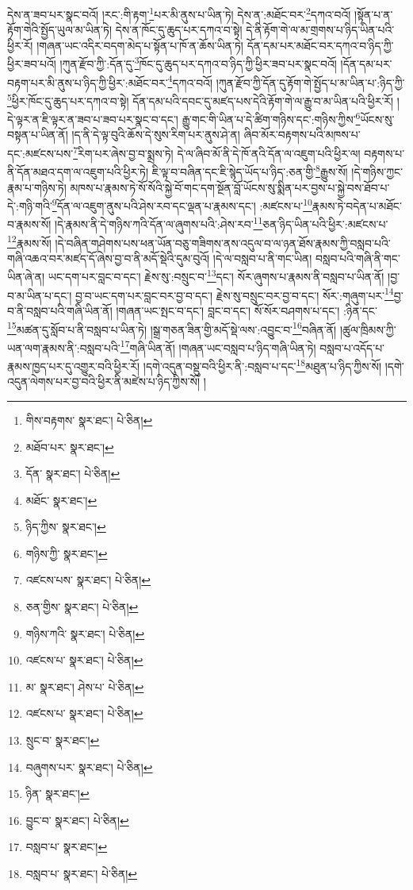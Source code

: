 དེས་ན་ཟབ་པར་སྣང་བའོ། །རང་:གི་རྟག་\footnote{གིས་བརྟགས་  སྣར་ཐང་།  པེ་ཅིན། }པར་མི་ནུས་པ་ཡིན་ཏེ། དེས་ན་:མཐོང་བར་\footnote{མཐོབ་པར་  སྣར་ཐང་། }དཀའ་བའོ། །སྟོན་པ་ན་རྟོག་གེའི་སྤྱོད་ཡུལ་མ་ཡིན་ཏེ། དེས་ན་ཁོང་དུ་ཆུད་པར་དཀའ་བ་སྟེ། དེ་ནི་རྟོག་གེ་ལ་མ་གྲགས་པ་ཉིད་ཡིན་པའི་ཕྱིར་རོ། །གཞན་ཡང་འདིར་བདག་མེད་པ་སྟོན་པ་ཁོ་ན་ཆོས་ཡིན་ཏེ། དོན་དམ་པར་མཐོང་བར་དཀའ་བ་ཉིད་ཀྱི་ཕྱིར་ཟབ་པའོ། །ཀུན་རྫོབ་ཀྱི་:དོན་དུ་\footnote{དོན་  སྣར་ཐང་།  པེ་ཅིན། }ཁོང་དུ་ཆུད་པར་དཀའ་བ་ཉིད་ཀྱི་ཕྱིར་ཟབ་པར་སྣང་བའོ། །དོན་དམ་པར་བརྟག་པར་མི་ནུས་པ་ཉིད་ཀྱི་ཕྱིར་:མཐོང་བར་\footnote{མཐོང་  སྣར་ཐང་། }དཀའ་བའོ། །ཀུན་རྫོབ་ཀྱི་དོན་དུ་རྟོག་གེ་སྤྱོད་པ་མ་ཡིན་པ་:ཉིད་ཀྱི་\footnote{ཉིད་ཀྱིས་  སྣར་ཐང་། }ཕྱིར་ཁོང་དུ་ཆུད་པར་དཀའ་བ་སྟེ། དོན་དམ་པའི་དབང་དུ་མཛད་པས་དེའི་རྟོག་གེ་ལ་རྒྱུ་བ་མ་ཡིན་པའི་ཕྱིར་རོ། །དེ་ལྟར་ན་ཇི་ལྟར་ན་ཟབ་པ་ཟབ་པར་སྣང་བ་དང་། རྒྱུ་གང་གི་ཡིན་པ་དེ་ཚིག་གཉིས་དང་:གཉིས་ཀྱིས་\footnote{གཉིས་ཀྱི་  སྣར་ཐང་། }ཡོངས་སུ་བསྟན་པ་ཡིན་ནོ། །ད་ནི་དེ་ལྟ་བུའི་ཆོས་དེ་སུས་རིག་པར་ནུས་ཤེ་ན། ཞིབ་མོར་བརྟགས་པའི་མཁས་པ་དང་:མཛངས་པས་\footnote{འཛངས་པས་  སྣར་ཐང་།  པེ་ཅིན། }རིག་པར་ཞེས་བྱ་བ་སྨྲས་ཏེ། དེ་ལ་ཞིབ་མོ་ནི་དེ་ཁོ་ནའི་དོན་ལ་འཇུག་པའི་ཕྱིར་ལ། བརྟགས་པ་ནི་དོན་མཐའ་དག་ལ་འཇུག་པའི་ཕྱིར་ཏེ། ཇི་ལྟ་བ་བཞིན་དང་ཇི་སྙེད་ཡོད་པ་ཉིད་:ཅན་གྱི་\footnote{ཅན་གྱིས་  སྣར་ཐང་།  པེ་ཅིན། }རྒྱུས་སོ། །དེ་གཉིས་ཀྱང་རྣམ་པ་གཉིས་ཏེ། མཁས་པ་རྣམས་ཏེ་སོ་སོའི་སྐྱེ་བོ་གང་དག་སྔོན་བློ་ཡོངས་སུ་སྨིན་པར་བྱས་པ་སྐྱེ་བས་ཐོབ་པ་དེ་:གཉི་གའི་\footnote{གཉིས་ཀའི་  སྣར་ཐང་།  པེ་ཅིན། }དོན་ལ་འཇུག་ནུས་པའི་ཤེས་རབ་དང་ལྡན་པ་རྣམས་དང་། :མཛངས་པ་\footnote{འཛངས་པ་  སྣར་ཐང་།  པེ་ཅིན། }རྣམས་ཏེ་བདེན་པ་མཐོང་བ་རྣམས་སོ། །དེ་རྣམས་ནི་དེ་གཉིས་ཀའི་དོན་ལ་ཞུགས་པའི་:ཤེས་རབ་\footnote{མ་  སྣར་ཐང་། ཤེས་པ་  པེ་ཅིན། }ཅན་ཉིད་ཡིན་པའི་ཕྱིར་:མཛངས་པ་\footnote{འཛངས་པ་  སྣར་ཐང་།  པེ་ཅིན། }རྣམས་སོ། །དེ་བཞིན་གཤེགས་པས་ཕན་ཡོན་བཅུ་གཟིགས་ནས་འདུལ་བ་ལ་ཉན་ཐོས་རྣམས་ཀྱི་བསླབ་པའི་གཞི་འཆའ་བར་མཛད་དོ་ཞེས་བྱ་བ་ནི་མདོ་སྡེའི་དུམ་བུའོ། །དེ་ལ་བསླབ་པ་ནི་གང་ཡིན། བསླབ་པའི་གཞི་ནི་གང་ཡིན་ཞེ་ན། ཡང་དག་པར་བླང་བ་དང་། རྗེས་སུ་:བསྲུང་བ་\footnote{སྲུང་བ་  སྣར་ཐང་། }དང་། སོར་ཞུགས་པ་རྣམས་ནི་བསླབ་པ་ཡིན་ནོ། །བྱ་བ་མ་ཡིན་པ་དང་། བྱ་བ་ཡང་དག་པར་བླང་བར་བྱ་བ་དང་། རྗེས་སུ་བསྲུང་བར་བྱ་བ་དང་། སོར་:གཞུག་པར་\footnote{བཞུགས་པར་  སྣར་ཐང་།  པེ་ཅིན། }བྱ་བ་ནི་བསླབ་པའི་གཞི་ཡིན་ནོ། །གཞན་ཡང་སྤང་བ་དང་། བླང་བ་དང་། སོ་སོར་བཤགས་པ་དང་། :ཉིན་དང་\footnote{ཉིན་  སྣར་ཐང་། }མཚན་དུ་སློབ་པ་ནི་བསླབ་པ་ཡིན་ཏེ། །སྒྲ་གཅན་ཟིན་གྱི་མདོ་སྡེ་ལས་:འབྱུང་བ་\footnote{བྱུང་བ་  སྣར་ཐང་།  པེ་ཅིན། }བཞིན་ནོ། །ཚུལ་ཁྲིམས་ཀྱི་ཡན་ལག་རྣམས་ནི་:བསླབ་པའི་\footnote{བསླབ་པ་  སྣར་ཐང་། }གཞི་ཡིན་ནོ། །གཞན་ཡང་བསླབ་པ་ཉིད་གཞི་ཡིན་ཏེ། བསླབ་པ་འདོད་པ་རྣམས་ཁྱད་པར་དུ་འགྱུར་བའི་ཕྱིར་རོ། །དགེ་འདུན་བསྡུ་བའི་ཕྱིར་ནི་:བསླབ་པ་དང་\footnote{བསླབ་པ་  སྣར་ཐང་།  པེ་ཅིན། }མཐུན་པ་ཉིད་ཀྱིས་སོ། །དགེ་འདུན་ལེགས་པར་བྱ་བའི་ཕྱིར་ནི་མཛེས་པ་ཉིད་ཀྱིས་སོ། །
